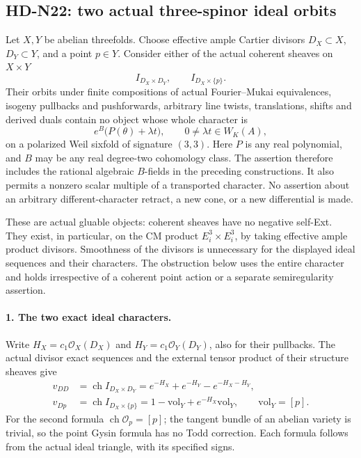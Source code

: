 \subsection{HD-N22: two actual three-spinor ideal orbits}
\label{sec:HD-N22}

Let $X,Y$ be abelian threefolds. Choose effective ample Cartier
divisors $D_X\subset X$, $D_Y\subset Y$, and a point $p\in Y$.
Consider either of the actual coherent sheaves on $X\times Y$
\begin{equation}
 I_{D_X\times D_Y},\qquad I_{D_X\times\{p\}}.       \tag{N22.1}
\end{equation}
Their orbits under finite compositions of actual Fourier--Mukai
equivalences, isogeny pullbacks and pushforwards, arbitrary line
twists, translations, shifts and derived duals contain no object
whose whole character is
\begin{equation}
 e^B\bigl(P(\theta)+\lambda t\bigr),\qquad
 0\ne\lambda t\in W_K(A),                            \tag{N22.2}
\end{equation}
on a polarized Weil sixfold of signature $(3,3)$.
Here $P$ is any real polynomial, and $B$ may be any real
degree-two cohomology class. The assertion therefore includes
the rational algebraic $B$-fields in the preceding constructions.
It also permits a nonzero scalar multiple of a transported
character. No assertion about an arbitrary different-character
retract, a new cone, or a new differential is made.

These are actual gluable objects: coherent sheaves have no
negative self-Ext. They exist, in particular, on the CM product
$E_i^3\times E_i^3$, by taking effective ample product divisors.
Smoothness of the divisors is unnecessary for the displayed
ideal sequences and their characters. The obstruction below uses
the entire character and holds irrespective of a coherent point
action or a separate semiregularity assertion.

\paragraph{1. The two exact ideal characters.}
Write $H_X=c_1\mathcal O_X(D_X)$ and
$H_Y=c_1\mathcal O_Y(D_Y)$, also for their pullbacks.
The actual divisor exact sequences and the external tensor
product of their structure sheaves give
\begin{align}
 v_{DD}&=\operatorname{ch}I_{D_X\times D_Y}
       =e^{-H_X}+e^{-H_Y}-e^{-H_X-H_Y},\nonumber\\
 v_{Dp}&=\operatorname{ch}I_{D_X\times\{p\}}
       =1-\mathrm{vol}_Y+e^{-H_X}\mathrm{vol}_Y,
 \qquad \mathrm{vol}_Y=[p].                          \tag{N22.3}
\end{align}
For the second formula $\operatorname{ch}\mathcal O_p=[p]$;
the tangent bundle of an abelian variety is trivial, so the
point Gysin formula has no Todd correction. Each formula follows
from the actual ideal triangle, with its specified signs.


